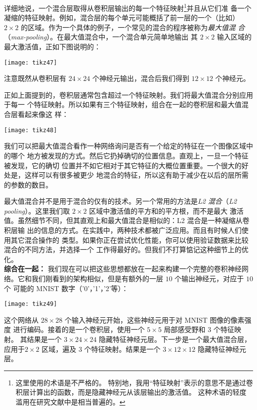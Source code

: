 详细地说，一个混合层取得从卷积层输出的每一个特征映射\footnote{这里使用的术语是不严格的。
特别地，我用“特征映射”表示的意思不是通过卷积层计算出的函数，而是隐藏神经元从该层输出的激活值。
这种术语的轻度滥用在研究文献中是相当普遍的。}并且从它们准
备一个凝缩的特征映射。例如，混合层的每个单元可能概括了前一层的一个（比如）$2
\times 2$ 的区域。作为一个具体的例子，一个常见的混合的程序被称为\emph{最大值混
  合}（\textit{max-pooling}）。在最大值混合中，一个混合单元简单地输出
其 $2 \times 2$ 输入区域的最大激活值，正如下图说明的：
\begin{center}
  \texttt{[image: tikz47]}
\end{center}
注意既然从卷积层有 $24 \times 24$ 个神经元输出，混合后我们得到 $12 \times
12$ 个神经元。

正如上面提到的，卷积层通常包含超过一个特征映射。我们将最大值混合分别应用于每一
个特征映射。所以如果有三个特征映射，组合在一起的卷积层和最大值混合层看起来像这
样：
\begin{center}
  \texttt{[image: tikz48]}  
\end{center}

我们可以把最大值混合看作一种网络询问是否有一个给定的特征在一个图像区域中的哪个
地方被发现的方式。然后它扔掉确切的位置信息。直观上，一旦一个特征被发现，它的确切
位置并不如它相对于其它特征的大概位置重要。一个很大的好处是，这样可以有很多被更少
地混合的特征，所以这有助于减少在以后的层所需的参数的数目。

最大值混合并不是用于混合的仅有的技术。另一个常用的方法是\emph{L2 混合}（\textit{L2
    pooling}）。这里我们取 $2 \times 2$ 区域中激活值的平方和的平方根，而不是最大
激活值。虽然细节不同，但其直观上和最大值混合是相似的：L2 混合是一种凝缩从卷积层输
出的信息的方式。在实践中，两种技术都被广泛应用。而且有时候人们使用其它混合操作的
类型。如果你正在尝试优化性能，你可以使用验证数据来比较混合的不同方法，并选择一个
工作得最好的。但我们不打算惦记这种细节上的优化。\\

\textbf{综合在一起：} 我们现在可以把这些思想都放在一起来构建一个完整的卷积神经网
络。它和我们刚看到的架构相似，但是有额外的一层 $10$ 个输出神经元，对应于 $10$ 个
可能的 MNIST 数字（'0'，'1'，'2'等）：
\begin{center}
  \texttt{[image: tikz49]}  
\end{center}

这个网络从 $28 \times 28$ 个输入神经元开始，这些神经元用于对 MNIST 图像的像素强度
进行编码。接着的是一个卷积层，使用一个 $5 \times 5$ 局部感受野和 $3$ 个特征映射。
其结果是一个 $3 \times 24 \times 24$ 隐藏特征神经元层。下一步是一个最大值混合层，
应用于$2 \times 2$ 区域，遍及 $3$ 个特征映射。结果是一个 $3 \times 12 \times 12$
隐藏特征神经元层。

